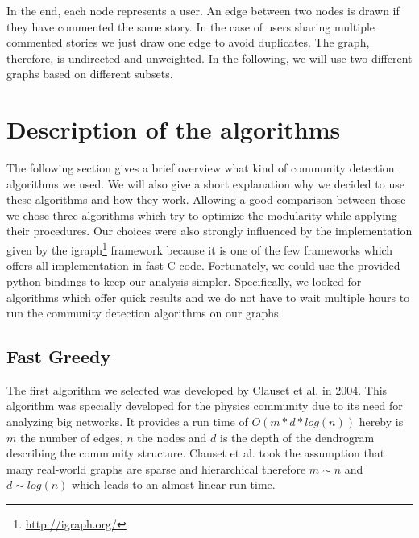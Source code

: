 \documentclass[sigconf]{acmart}
\begin{document}
In the end, each node represents a user.
An edge between two nodes is drawn if they have commented the same story.
In the case of users sharing multiple commented stories we just draw one edge to avoid duplicates.
The graph, therefore, is undirected and unweighted.
In the following, we will use two different graphs based on different subsets.




\section{Description of the algorithms}

The following section gives a brief overview what kind of community detection algorithms we used.
We will also give a short explanation why we decided to use these algorithms and how they work. 
Allowing a good comparison between those we chose three algorithms which try to optimize the modularity while applying their procedures. Our choices were also strongly influenced by the implementation given by the igraph\footnote{\url{http://igraph.org/}} framework because it is one of the few frameworks which offers all implementation in fast C code. Fortunately, we could use the provided python bindings to keep our analysis simpler. Specifically, we looked for algorithms which offer quick results and we do not have to wait multiple hours to run the community detection algorithms on our graphs.

\subsection{Fast Greedy} \label{fast_greedy}

The first algorithm we selected was developed by Clauset et al. \cite{clauset2004finding} in 2004. This algorithm was specially developed for the physics community due to its need for analyzing big networks. It provides a run time of $O(m*d* log(n))$ hereby is $m$ the number of edges, $n$ the nodes and $d$ is the depth of the dendrogram describing the community structure. Clauset et al. took the assumption that many real-world graphs are sparse and hierarchical therefore $m \sim n$ and $d \sim log(n)$ which leads to an almost linear run time.
\end{document}
